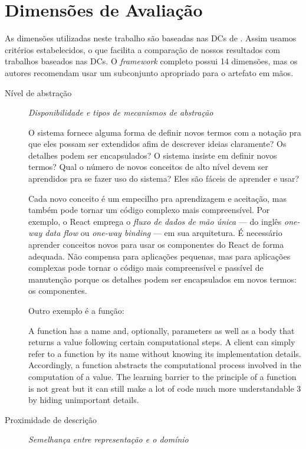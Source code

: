 \section{Dimensões de Avaliação}
\label{sec:orgfe369d3}
As dimensões utilizadas neste trabalho são baseadas nas DCs de
\textcite{green1989}. Assim usamos critérios estabelecidos, o que facilita a
comparação de nossos resultados com trabalhos baseados nas DCs. O \emph{framework}
completo possui 14 dimensões, mas os autores recomendam usar um subconjunto
apropriado para o artefato em mãos.

\begin{description}
\item[{Nível de abstração}] \emph{Disponibilidade e tipos de mecanismos de abstração}

O sistema fornece alguma forma de definir novos termos com a notação pra
que eles possam ser extendidos afim de descrever ideias claramente? Os
detalhes podem ser encapsulados? O sistema insiste em definir novos
termos? Qual o número de novos conceitos de alto nível devem ser
aprendidos pra se fazer uso do sistema? Eles são fáceis de aprender e
usar?

   Cada novo conceito é um empecilho pra aprendizagem e aceitação, mas
também pode tornar um código complexo mais compreensível. Por exemplo, o
React emprega o \emph{fluxo de dados de mão única} --- do inglês \emph{one-way data
flow} ou \emph{one-way binding} --- em sua arquitetura. É necessário aprender
conceitos novos para usar os componentes do React de forma adequada. Não
compensa para aplicações pequenas, mas para aplicações complexas pode tornar
o código mais compreensível e passível de manutenção porque os detalhes
podem ser encapsulados em novos termos: os componentes.

Outro exemplo é a função:

\begin{citacao}
  A function has a name and, optionally, parameters as well as a body that
  returns a value following certain computational steps. A client can simply
  refer to a function by its name without knowing its implementation details.
  Accordingly, a function abstracts the computational process involved in the
  computation of a value. The learning barrier to the principle of a function is
  not great but it can still make a lot of code much more understandable 3 by
  hiding unimportant details.
  \cite[p.~13]{kiss2014}
\end{citacao}

\item[{Proximidade de descrição}]  \emph{Semelhança entre representação e o domínio}


\end{description}
